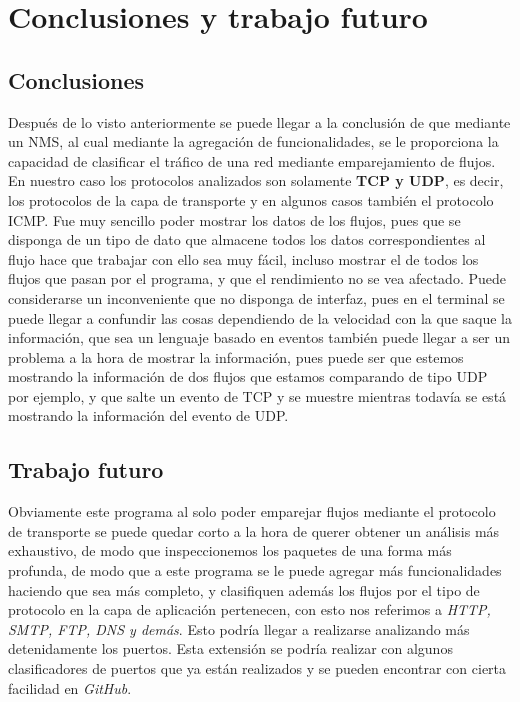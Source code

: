 \chapter{Conclusiones y trabajo futuro}

\section{Conclusiones}

Después de lo visto anteriormente se puede llegar a 
la conclusión de que mediante un NMS, al cual mediante 
la agregación de funcionalidades, se le proporciona la 
capacidad de clasificar el tráfico de una red mediante 
emparejamiento de flujos. En nuestro caso los protocolos 
analizados son solamente \textbf{TCP y UDP}, es decir, 
los protocolos de la capa de transporte y en algunos casos 
también el protocolo ICMP.
\intro
Fue muy sencillo poder mostrar los datos de los flujos, 
pues que se disponga de un tipo de dato que almacene todos 
los datos correspondientes al flujo hace que trabajar con 
ello sea muy fácil, incluso mostrar el de todos los 
flujos que pasan por el programa, y que el rendimiento 
no se vea afectado. Puede considerarse un inconveniente 
que no disponga de interfaz, pues en el terminal se puede 
llegar a confundir las cosas dependiendo de la velocidad 
con la que saque la información, que sea un lenguaje basado 
en eventos también puede llegar a ser un problema a la hora 
de mostrar la información, pues puede ser que estemos 
mostrando la información de dos flujos que estamos comparando 
de tipo UDP por ejemplo, y que salte un evento de TCP y 
se muestre mientras todavía se está mostrando la información 
del evento de UDP.

\section{Trabajo futuro}

Obviamente este programa al solo poder emparejar flujos 
mediante el protocolo de transporte se puede quedar corto 
a la hora de querer obtener un análisis más exhaustivo, de 
modo que inspeccionemos los paquetes de una forma más profunda, 
de modo que a este programa se le puede agregar más funcionalidades 
haciendo que sea más completo, y clasifiquen además los flujos 
por el tipo de protocolo en la capa de aplicación pertenecen, 
con esto nos referimos a \textit{HTTP, SMTP, FTP, DNS y demás}. Esto 
podría llegar a realizarse analizando más detenidamente los puertos. 
Esta extensión se podría realizar con algunos clasificadores de puertos 
que ya están realizados y se pueden encontrar con cierta facilidad en 
\textit{GitHub}.
